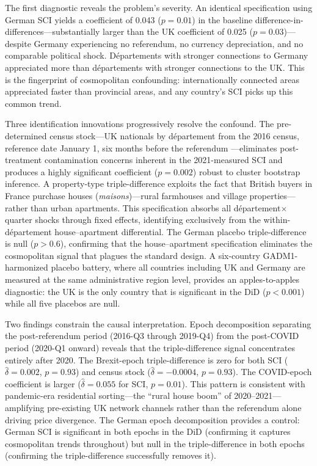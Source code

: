 \documentclass[12pt]{article}
\begin{document}
The first diagnostic reveals the problem's severity. An identical specification using German SCI yields a coefficient of 0.043 ($p = 0.01$) in the baseline difference-in-differences---substantially larger than the UK coefficient of 0.025 ($p = 0.03$)---despite Germany experiencing no referendum, no currency depreciation, and no comparable political shock. D\'epartements with stronger connections to Germany appreciated more than d\'epartements with stronger connections to the UK. This is the fingerprint of cosmopolitan confounding: internationally connected areas appreciated faster than provincial areas, and any country's SCI picks up this common trend.

Three identification innovations progressively resolve the confound. The pre-determined census stock---UK nationals by d\'epartement from the 2016 census, reference date January 1, six months before the referendum \citep{insee2019premiere}---eliminates post-treatment contamination concerns inherent in the 2021-measured SCI and produces a highly significant coefficient ($p = 0.002$) robust to cluster bootstrap inference. A property-type triple-difference exploits the fact that British buyers in France purchase houses (\textit{maisons})---rural farmhouses and village properties---rather than urban apartments. This specification absorbs all d\'epartement$\times$quarter shocks through fixed effects, identifying exclusively from the within-d\'epartement house--apartment differential. The German placebo triple-difference is null ($p > 0.6$), confirming that the house--apartment specification eliminates the cosmopolitan signal that plagues the standard design. A six-country GADM1-harmonized placebo battery, where all countries including UK and Germany are measured at the same administrative region level, provides an apples-to-apples diagnostic: the UK is the only country that is significant in the DiD ($p < 0.001$) while all five placebos are null.

Two findings constrain the causal interpretation. Epoch decomposition separating the post-referendum period (2016-Q3 through 2019-Q4) from the post-COVID period (2020-Q1 onward) reveals that the triple-difference signal concentrates entirely after 2020. The Brexit-epoch triple-difference is zero for both SCI ($\hat{\delta} = 0.002$, $p = 0.93$) and census stock ($\hat{\delta} = -0.0004$, $p = 0.93$). The COVID-epoch coefficient is larger ($\hat{\delta} = 0.055$ for SCI, $p = 0.01$). This pattern is consistent with pandemic-era residential sorting---the ``rural house boom'' of 2020--2021---amplifying pre-existing UK network channels rather than the referendum alone driving price divergence. The German epoch decomposition provides a control: German SCI is significant in both epochs in the DiD (confirming it captures cosmopolitan trends throughout) but null in the triple-difference in both epochs (confirming the triple-difference successfully removes it).
\end{document}

